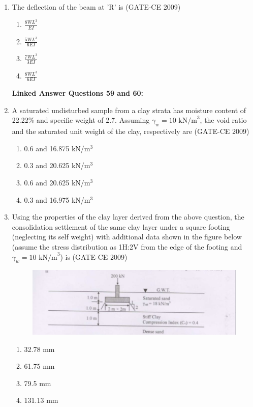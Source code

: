 \documentclass[journal,12pt,onecolumn]{article}
\theoremstyle{remark}
\begin{document}
\begin{enumerate}
    \item The deflection of the beam at 'R' is (GATE-CE 2009)
    \begin{enumerate}
        \item $\frac{8WL^3}{EI}$ 
        \item $\frac{5WL^3}{6EI}$ 
        \item $\frac{7WL^3}{3EI}$ 
        \item $\frac{8WL^3}{6EI}$
    \end{enumerate}
    
\textbf{Linked Answer Questions 59 and 60:}
    \item A saturated undisturbed sample from a clay strata has moisture content of 22.22\% and specific weight of 2.7. Assuming $\gamma_w = 10 \text{ kN/m}^3$, the void ratio and the saturated unit weight of the clay, respectively are (GATE-CE 2009)
    \begin{enumerate}
        \item 0.6 and 16.875 kN/m$^3$ 
        \item 0.3 and 20.625 kN/m$^3$ 
        \item 0.6 and 20.625 kN/m$^3$ 
        \item 0.3 and 16.975 kN/m$^3$
    \end{enumerate}
    
    \item Using the properties of the clay layer derived from the above question, the consolidation settlement of the same clay layer under a square footing (neglecting its self weight) with additional data shown in the figure below (assume the stress distribution as 1H:2V from the edge of the footing and $\gamma_w = 10 \text{ kN/m}^3$) is (GATE-CE 2009)
    \begin{figure}[H]
    \centering
    \includegraphics[width=0.7\columnwidth]{figs/image7.jpg}
    \label{fig:placeholder}
    \end{figure}
    
    \begin{enumerate}
        \item 32.78 mm 
        \item 61.75 mm 
        \item 79.5 mm 
        \item 131.13 mm
    \end{enumerate}
\end{enumerate}
\end{document}
